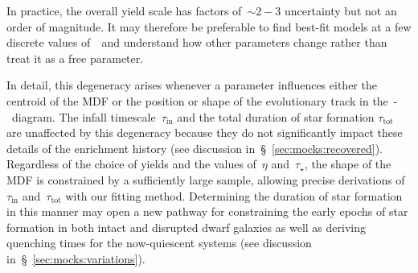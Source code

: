 In practice, the overall yield scale has factors of~$\sim$$2 - 3$ uncertainty
but not an order of magnitude.
It may therefore be preferable to find best-fit models at a few discrete
values of~\yacc~and understand how other parameters change rather than treat
it as a free parameter.
\par
In detail, this degeneracy arises whenever a parameter influences either the
centroid of the MDF or the position or shape of the evolutionary track in
the~\afe-\feh~diagram.
The infall timescale~$\tau_\text{in}$ and the total duration of star formation
$\tau_\text{tot}$ are unaffected by this degeneracy because they do not
significantly impact these details of the enrichment history (see discussion
in~\S~\ref{sec:mocks:recovered}).
Regardless of the choice of yields and the values of~$\eta$ and~$\tau_\star$,
the shape of the MDF is constrained by a sufficiently large sample, allowing
precise derivations of~$\tau_\text{in}$ and~$\tau_\text{tot}$ with our fitting
method.
Determining the duration of star formation in this manner may open a new
pathway for constraining the early epochs of star formation in both intact
and disrupted dwarf galaxies as well as deriving quenching times for the
now-quiescent systems (see discussion in~\S~\ref{sec:mocks:variations}).


